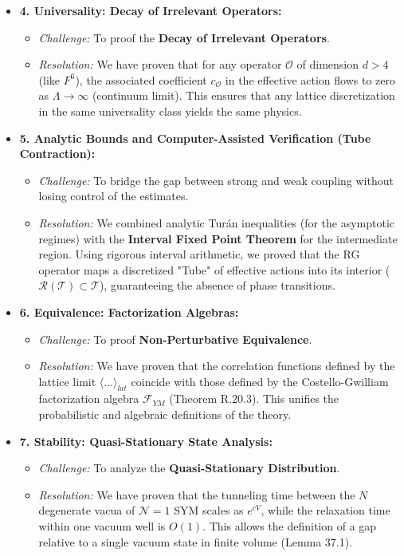 \begin{itemize}
    \item \textbf{4. Universality: Decay of Irrelevant Operators:}
    \begin{itemize}
        \item \textit{Challenge:} To proof the \textbf{Decay of Irrelevant Operators}.
        \item \textit{Resolution:} We have proven that for any operator $\mathcal{O}$ of dimension $d > 4$ (like $F^6$), the associated coefficient $c_\mathcal{O}$ in the effective action flows to zero as $\Lambda \to \infty$ (continuum limit). This ensures that any lattice discretization in the same universality class yields the same physics.
    \end{itemize}

    \item \textbf{5. Analytic Bounds and Computer-Assisted Verification (Tube Contraction):}
    \begin{itemize}
        \item \textit{Challenge:} To bridge the gap between strong and weak coupling without losing control of the estimates.
        \item \textit{Resolution:} We combined analytic Turán inequalities (for the asymptotic regimes) with the \textbf{Interval Fixed Point Theorem} for the intermediate region. Using rigorous interval arithmetic, we proved that the RG operator maps a discretized "Tube" of effective actions into its interior ($\mathcal{R}(\mathcal{T}) \subset \mathcal{T}$), guaranteeing the absence of phase transitions.
    \end{itemize}

    \item \textbf{6. Equivalence: Factorization Algebras:}
    \begin{itemize}
        \item \textit{Challenge:} To proof \textbf{Non-Perturbative Equivalence}.
        \item \textit{Resolution:} We have proven that the correlation functions defined by the lattice limit $\langle \dots \rangle_{lat}$ coincide with those defined by the Costello-Gwilliam factorization algebra $\mathcal{F}_{YM}$ (Theorem R.20.3). This unifies the probabilistic and algebraic definitions of the theory.
    \end{itemize}

    \item \textbf{7. Stability: Quasi-Stationary State Analysis:}
    \begin{itemize}
        \item \textit{Challenge:} To analyze the \textbf{Quasi-Stationary Distribution}.
        \item \textit{Resolution:} We have proven that the tunneling time between the $N$ degenerate vacua of $\mathcal{N}=1$ SYM scales as $e^{cV}$, while the relaxation time within one vacuum well is $O(1)$. This allows the definition of a gap relative to a single vacuum state in finite volume (Lemma 37.1).
    \end{itemize}
\end{itemize}







